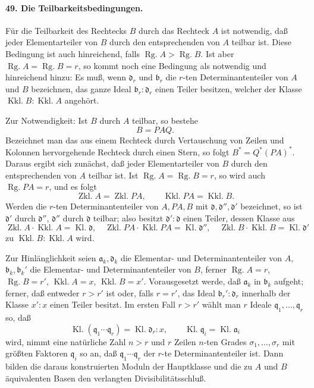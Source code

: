 \documentclass[11pt]{article}
\newcommand{\Rg}{\operatorname{Rg.}}
\newcommand{\Kl}{\operatorname{Kl.}}
\newcommand{\Zkl}{\operatorname{Zkl.}}
\newcommand{\Kkl}{\operatorname{Kkl.}}
\begin{document}
\paragraph{49. Die Teilbarkeitsbedingungen.}
Für die Teilbarkeit des Rechtecks $B$ durch das Rechteck $A$ ist notwendig, daß jeder Elementarteiler von $B$ durch den entsprechenden von $A$ teilbar ist. Diese Bedingung ist auch hinreichend, falls $\Rg A>\Rg B$. Ist aber $\Rg A=\Rg B=r$, so kommt noch eine Bedingung als notwendig und hinreichend hinzu: Es muß, wenn $\mathfrak d_r$ und $\mathfrak b_r$ die $r$-ten Determinantenteiler von $A$ und $B$ bezeichnen, das ganze Ideal $\mathfrak b_r:\mathfrak d_r$ einen Teiler besitzen, welcher der Klasse $\Kkl B:\Kkl A$ angehört.

Zur Notwendigkeit: Ist $B$ durch $A$ teilbar, so bestehe
\begin{equation}
B=PAQ.
\tag{82}
\end{equation}
Bezeichnet man das aus einem Rechteck durch Vertauschung von Zeilen und Kolonnen hervorgehende Rechteck durch einen Stern, so folgt $B^*=Q^*(PA)^*$. Daraus ergibt sich zunächst, daß jeder Elementarteiler von $B$ durch den entsprechenden von $A$ teilbar ist. Ist $\Rg A=\Rg B=r$, so wird auch $\Rg PA=r$, und es folgt
\begin{equation}
\Zkl A=\Zkl PA,
\qquad
\Kkl PA=\Kkl B.
\tag{83}
\end{equation}
Werden die $r$-ten Determinantenteiler von $A,PA,B$ mit $\mathfrak d,
\mathfrak d'',
\mathfrak d'$ bezeichnet, so ist $\mathfrak d'$ durch $\mathfrak d''$, $\mathfrak d''$ durch $\mathfrak d$ teilbar; also besitzt $\mathfrak d':\mathfrak d$ einen Teiler, dessen Klasse aus
\begin{equation}
\Zkl A\cdot\Kkl A=\Kl\mathfrak d,
\quad
\Zkl PA\cdot\Kkl PA=\Kl\mathfrak d'',
\quad
\Zkl B\cdot\Kkl B=\Kl\mathfrak d'
\tag{84}
\end{equation}
zu $\Kkl B:\Kkl A$ wird.

Zur Hinlänglichkeit seien $\mathfrak a_k,
\mathfrak d_k$ die Elementar- und Determinantenteiler von $A$, $\mathfrak b_k,
\mathfrak b_k'$ die Elementar- und Determinantenteiler von $B$, ferner $\Rg A=r$, $\Rg B=r'$, $\Kkl A=x$, $\Kkl B=x'$. Vorausgesetzt werde, daß $\mathfrak a_k$ in $\mathfrak b_k$ aufgeht; ferner, daß entweder $r>r'$ ist oder, falls $r=r'$, das Ideal $\mathfrak b_r':\mathfrak d_r$ innerhalb der Klasse $x':x$ einen Teiler besitzt. Im ersten Fall $r>r'$ wählt man $r$ Ideale $\mathfrak q_1,
\ldots,
\mathfrak q_r$ so, daß
\begin{equation}
\Kl(\mathfrak q_1\cdots\mathfrak q_r)=\Kl\mathfrak d_r:x,
\qquad
\Kl\mathfrak q_i=\Kl\mathfrak a_i
\tag{85}
\end{equation}
wird, nimmt eine natürliche Zahl $n>r$ und $r$ Zeilen $n$-ten Grades $\sigma_1,
\ldots,
\sigma_r$ mit größten Faktoren $\mathfrak q_i$ so an, daß $\mathfrak q_1\cdots\mathfrak q_r$ der $r$-te Determinantenteiler ist. Dann bilden die daraus konstruierten Moduln der Hauptklasse und die zu $A$ und $B$ äquivalenten Basen den verlangten Divisibilitätsschluß.
\end{document}
